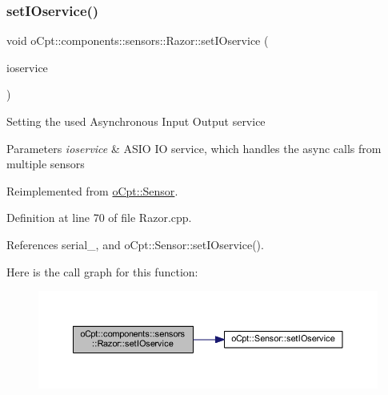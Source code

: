 \subsubsection{\texorpdfstring{set\+I\+Oservice()}{setIOservice()}}
{\footnotesize\ttfamily void o\+Cpt\+::components\+::sensors\+::\+Razor\+::set\+I\+Oservice (\begin{DoxyParamCaption}\item[{boost\+::shared\+\_\+ptr$<$ boost\+::asio\+::io\+\_\+service $>$}]{ioservice }\end{DoxyParamCaption})\hspace{0.3cm}{\ttfamily [virtual]}}

Setting the used Asynchronous Input Output service 
\begin{DoxyParams}{Parameters}
{\em ioservice} & A\+S\+IO IO service, which handles the async calls from multiple sensors \\
\hline
\end{DoxyParams}


Reimplemented from \hyperlink{classo_cpt_1_1_sensor_ae7d47e18df5eb7854bf71fbbee9568df}{o\+Cpt\+::\+Sensor}.



Definition at line 70 of file Razor.\+cpp.



References serial\+\_\+, and o\+Cpt\+::\+Sensor\+::set\+I\+Oservice().

Here is the call graph for this function\+:\nopagebreak
\begin{figure}[H]
\begin{center}
\leavevmode
\includegraphics[width=350pt]{classo_cpt_1_1components_1_1sensors_1_1_razor_a0f251fe3b51bf1a96b5d1e14e69a6d57_cgraph}
\end{center}
\end{figure}
\hypertarget{classo_cpt_1_1components_1_1sensors_1_1_razor_a25a3159510e0b725eaf817b8775420ac}{}\label{classo_cpt_1_1components_1_1sensors_1_1_razor_a25a3159510e0b725eaf817b8775420ac} 
